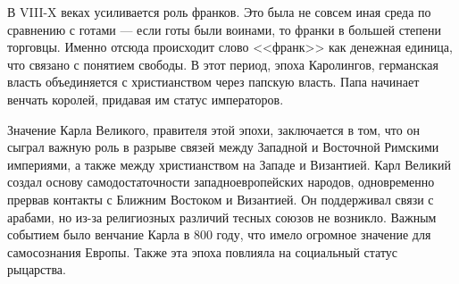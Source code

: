 В VIII-X веках усиливается роль франков. Это была не совсем иная среда по сравнению с готами --- если готы были воинами, то франки в большей степени торговцы. Именно отсюда происходит слово <<франк>> как денежная единица, что связано с понятием свободы. В этот период, эпоха Каролингов, германская власть объединяется с христианством через папскую власть. Папа начинает венчать королей, придавая им статус императоров.

Значение Карла Великого, правителя этой эпохи, заключается в том, что он сыграл важную роль в разрыве связей между Западной и Восточной Римскими империями, а также между христианством на Западе и Византией. Карл Великий создал основу самодостаточности западноевропейских народов, одновременно прервав контакты с Ближним Востоком и Византией. Он поддерживал связи с арабами, но из-за религиозных различий тесных союзов не возникло. Важным событием было венчание Карла в 800 году, что имело огромное значение для самосознания Европы. Также эта эпоха повлияла на социальный статус рыцарства.

